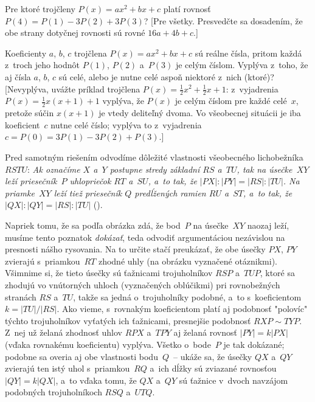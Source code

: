 {\D
Pre ktoré trojčleny $P(x)=ax^2+bx+c$
platí rovnosť $P(4)=P(1)-3P(2)+3P(3)$? [Pre všetky.
Presvedčte sa dosadením, že obe strany dotyčnej rovnosti
sú rovné $16a+4b+c$.]

Koeficienty $a$, $b$, $c$ trojčlena
$P(x)=ax^2+bx+c$ sú reálne čísla, pritom každá z~troch jeho
hodnôt $P(1)$, $P(2)$ a~$P(3)$ je celým číslom. Vyplýva z~toho, že
aj čísla $a$, $b$, $c$ sú celé, alebo je nutne celé aspoň
niektoré z~nich (ktoré)? [Nevyplýva, uvážte príklad
trojčlena $P(x)=\frac12x^2+\frac12x+1$: z~vyjadrenia
$P(x)=\frac12x(x+1)+1$ vyplýva, že $P(x)$ je celým číslom pre každé
celé~$x$, pretože súčin $x(x+1)$ je vtedy deliteľný dvoma.
Vo všeobecnej situácii je iba koeficient~$c$ nutne celé číslo;
vyplýva to z~vyjadrenia $c=P(0)=3P(1)-3P(2)+P(3)$.]
}

{%
Pred samotným riešením odvodíme dôležité vlastnosti všeobecného
lichobežníka $RSTU$: {\sl Ak označíme $X$ a~$Y$ postupne stredy
základní $RS$ a~$TU$, tak na úsečke~$XY$ leží priesečník~$P$
uhlopriečok $RT$ a~$SU$, a~to tak, že $|PX|:|PY|=|RS|:|TU|$.
Na priamke~$XY$ leží tiež priesečník $Q$ predĺžených ramien $RU$
a~$ST$, a~to tak, že $|QX|:|QY|=|RS|:|TU|$} (\obr).
%

Napriek tomu, že sa podľa obrázka zdá, že bod~$P$ na úsečke~$XY$
naozaj leží, musíme tento poznatok {\it dokázať}, teda odvodiť
argumentáciou nezávislou na presnosti nášho rysovania. Na to určite
stačí preukázať, že obe úsečky $PX$, $PY$ zvierajú s~priamkou~$RT$
zhodné uhly (na obrázku vyznačené otáznikmi). Všimnime si, že
tieto úsečky sú ťažnicami trojuholníkov $RSP$ a~$TUP$, ktoré sa
zhodujú vo vnútorných uhloch (vyznačených oblúčikmi)
pri rovnobežných stranách $RS$ a~$TU$, takže sa jedná o~trojuholníky
podobné, a~to s~koeficientom $k=|TU|/|RS|$. Ako vieme,
s~rovnakým koeficientom platí aj podobnosť "polovíc"
týchto trojuholníkov vyťatých ich ťažnicami, presnejšie
podobnosť $RXP\sim TYP$. Z~nej už želaná
zhodnosť uhlov $RPX$ a~$TPY$ aj želaná
rovnosť $|PY|=k|PX|$ (vďaka rovnakému koeficientu) vyplýva.
%
Všetko o~bode~$P$ je tak dokázané; podobne sa
overia aj obe vlastnosti bodu~$Q$~-- ukáže sa, že úsečky $QX$
a~$QY$ zvierajú ten istý uhol s~priamkou~$RQ$ a~ich dĺžky sú zviazané
rovnosťou $|QY|=k|QX|$, a~to vďaka tomu, že $QX$ a~$QY$ sú
ťažnice v~dvoch navzájom podobných trojuholníkoch $RSQ$ a~$UTQ$.

}
